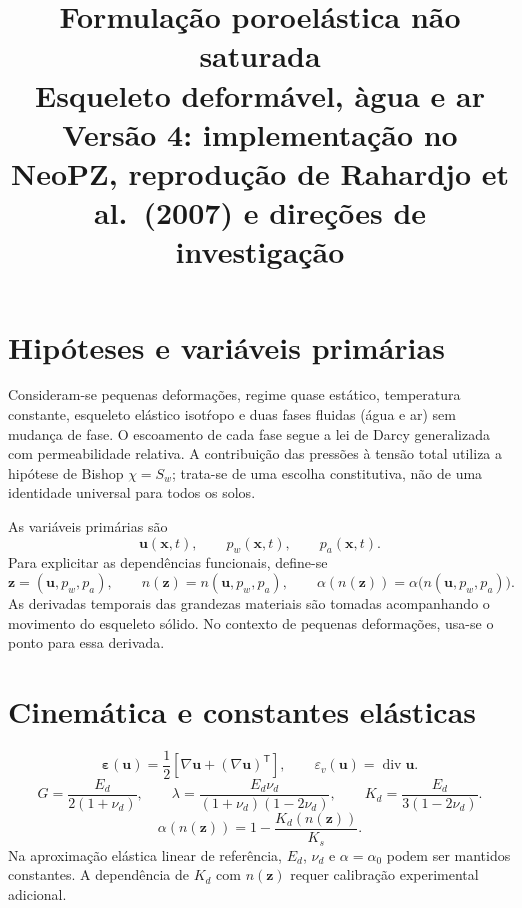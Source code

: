 \documentclass[11pt,a4paper]{article}
\title{Formula\c{c}\~ao poroel\'astica n\~ao saturada\\
\large Esqueleto deform\'avel, \`agua e ar\\[2pt]
\normalsize Vers\~ao 4: implementa\c{c}\~ao no NeoPZ, reprodu\c{c}\~ao de Rahardjo et al.\ (2007) e dire\c{c}\~oes de investiga\c{c}\~ao}
\author{}
\date{}
\numberwithin{equation}{section}
\newcommand{\Div}{\operatorname{div}}
\begin{document}
\maketitle
\vspace{-2em}

\section{Hip\'oteses e vari\'aveis prim\'arias}

Consideram-se pequenas deforma\c{c}\~oes, regime quase est\'atico,
temperatura constante, esqueleto el\'astico isot\'ropo e duas fases fluidas
(\'agua e ar) sem mudan\c{c}a de fase. O escoamento de cada fase segue
a lei de Darcy generalizada com permeabilidade relativa. A contribui\c{c}\~ao
das press\~oes \`a tens\~ao total utiliza a hip\'otese de Bishop
$\chi=S_w$; trata-se de uma escolha constitutiva, n\~ao de uma identidade
universal para todos os solos.

As vari\'aveis prim\'arias s\~ao
\begin{equation}
\boxed{\mathbf u(\mathbf x,t),\qquad p_w(\mathbf x,t),\qquad p_a(\mathbf x,t).}
\end{equation}
Para explicitar as depend\^encias funcionais, define-se
\begin{equation}
\mathbf z=(\mathbf u,p_w,p_a),\qquad
n(\mathbf z)=n(\mathbf u,p_w,p_a),\qquad
\alpha(n(\mathbf z))=\alpha\bigl(n(\mathbf u,p_w,p_a)\bigr).
\end{equation}
As derivadas temporais das grandezas materiais s\~ao tomadas acompanhando
o movimento do esqueleto s\'olido. No contexto de pequenas deforma\c{c}\~oes,
usa-se o ponto para essa derivada.

\section{Cinem\'atica e constantes el\'asticas}

\begin{equation}
\boxed{\boldsymbol\varepsilon(\mathbf u)=
\frac12\left[\nabla\mathbf u+(\nabla\mathbf u)^{\mathsf T}\right],
\qquad \varepsilon_v(\mathbf u)=\Div\mathbf u.}
\end{equation}
\begin{equation}
G=\frac{E_d}{2(1+\nu_d)},\qquad
\lambda=\frac{E_d\nu_d}{(1+\nu_d)(1-2\nu_d)},\qquad
K_d=\frac{E_d}{3(1-2\nu_d)}.
\end{equation}
\begin{equation}
\boxed{\alpha(n(\mathbf z))=1-\frac{K_d(n(\mathbf z))}{K_s}.}
\end{equation}
Na aproxima\c{c}\~ao el\'astica linear de refer\^encia, $E_d$, $\nu_d$
e $\alpha=\alpha_0$ podem ser mantidos constantes. A depend\^encia de
$K_d$ com $n(\mathbf z)$ requer calibra\c{c}\~ao experimental adicional.
\end{document}
